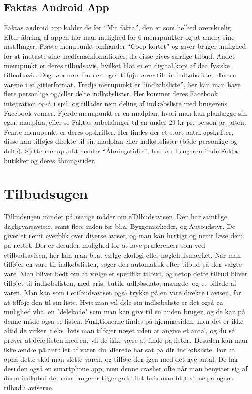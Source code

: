 	\subsection{Faktas Android App}
		Faktas android app kalder de for ``Mit fakta'', den er som helhed overskuelig.
		Efter åbning af appen har man mulighed for 6 menupunkter og at ændre sine instillinger.
		Første menupunkt omhander ``Coop-kortet'' og giver bruger mulighed for at indtaste sine medlemsinfomationer, da disse gives særlige tilbud.
		Andet menupunkt er deres tilbudsavis, hvilket blot er en digital kopi af den fysiske tilbudsavis. 
		Dog kan man fra den også tilføje varer til sin indkøbsliste, eller se varene i et gitterformat.
		Tredje menupunkt er ``indkøbsliste'', her kan man have flere personlige og/eller delte indkøbslister.
		Her kommer deres Facebook integration også i spil, og tillader nem deling af indkøbsliste med brugerens Facebook venner.
		Fjerde menupunkt er en madplan, hvori man kan planlægge sin egen madplan, eller se Faktas anbefalinger til en under 20 kr pr. person pr. aften.
		Femte menupunkt er deres opskrifter.
		Her findes der et stort antal opskrifter, disse kan tilføjes direkte til sin madplan eller indkøbslister (både personlige og delte).
		Sjette menupunkt hedder ``Åbningstider'', her kan brugeren finde Faktas butikker og deres åbningstider. 

\section{Tilbudsugen}

Tilbudsugen minder på mange måder om eTilbudsavisen. 
Den har samtlige dagligvareaviser, samt flere inden for bl.a. Byggemarkeder, og Autoudstyr.
De giver et nemt overblik over diverse aviser, og man kan hurtigt og nemt læse dem på nettet. 
Der er desuden mulighed for at lave præferencer som ved etilbudsavisen, her kan man bl.a. vælge økologi eller nøglehulsmærket.
Når man tilføjer en vare til indkøbslisten, søger den automatisk efter tilbud på den valgte vare. 
Man bliver bedt om at vælge et specifikt tilbud, og netop dette tilbud bliver tilføjet til indkøbslisten, med pris, butik, udløbsdato, mængde, og et billede af varen.
Man kan som i etilbudsavisen også trykke på en vare direkte i avisen, for at tilføje den til sin liste.
Hvis man vil dele sin indkøbsliste er det også en mulighed vha. en "delekode" som man kan give til en anden bruger, og de kan på denne måde også se listen.
Funktionerne findes på hjemmesiden, men det er ikke altid de virker, f.eks. hvis man tilføjer noget uden at angive et antal, og du så prøver at dele listen med en, vil de ikke være at finde på listen.
Desuden kan man ikke ændre på antallet af varen du allerede har sat på din indkøbsliste. 
For at opnå dette skal man slette varen, og tilføje den igen med det nye antal.
De har desuden også en smartphone app, men denne crasher ofte når man benytter sig af deres indkøbsliste, men fungerer tilgengæld fint hvis man blot vil se på ugens tilbud i aviserne.


